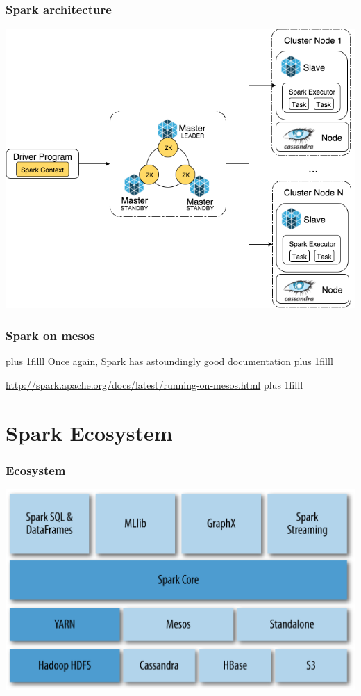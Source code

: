 \documentclass{beamer}
\newcommand{\btVFill}{\vskip0pt plus 1filll}
\begin{document}
\begin{frame}
  \frametitle{Spark architecture}
  \includegraphics[height=.9\textheight]{images/mesos-spark.png}
\end{frame}

\begin{frame}
  \frametitle{Spark on mesos}
  \btVFill
  \center
  {\Large Once again, Spark has astoundingly good documentation}
  \btVFill

{\large  \href{http://spark.apache.org/docs/latest/running-on-mesos.html}{http://spark.apache.org/docs/latest/running-on-mesos.html}}
  \btVFill
\end{frame}


  
\section{Spark Ecosystem}

\begin{frame}
  \frametitle{Ecosystem}
  \includegraphics[width=\textwidth]{images/sparkecosystem.png}
\end{frame}
\end{document}
